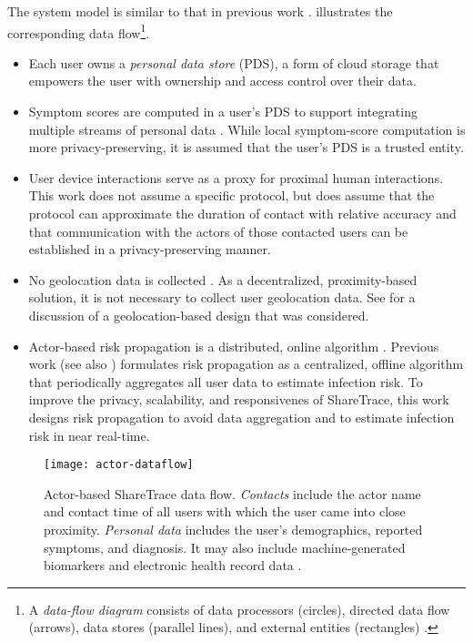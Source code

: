 The system model is similar to that in previous work \cite{Ayday2020,Ayday2021}.  illustrates the corresponding data flow\footnote{A \emph{data-flow diagram} consists of data processors (circles), directed data flow (arrows), data stores (parallel lines), and external entities (rectangles) \cite[pp. 437--438]{Fowler2004}\label{foot:dataflow}.}.
%
\begin{itemize}
    \item Each user owns a \emph{personal data store} (PDS), a form of cloud storage that empowers the user with ownership and access control over their data.
    \item Symptom scores are computed in a user's PDS to support integrating multiple streams of personal data \cite{Ayday2020}. While local symptom-score computation \cite{Ayday2020, Ayday2021} is more privacy-preserving, it is assumed that the user's PDS is a trusted entity.
    \item User device interactions serve as a proxy for proximal human interactions. This work does not assume a specific protocol, but does assume that the protocol can approximate the duration of contact with relative accuracy and that communication with the actors of those contacted users can be
    established in a privacy-preserving manner.
    \item No geolocation data is collected \cite{Ayday2020}. As a decentralized, proximity-based solution, it is not necessary to collect user geolocation data. See  for a discussion of a geolocation-based design that was considered.
    \item Actor-based risk propagation is a distributed, online algorithm \cite[pp. 791--818]{Cormen2022}. Previous work \cite{Ayday2020, Ayday2021} (see also ) formulates risk propagation as a centralized, offline algorithm that periodically aggregates all user data to estimate infection risk. To improve the privacy, scalability, and responsivenes of ShareTrace, this work designs risk propagation to avoid data aggregation and to estimate infection risk in near real-time.
\end{itemize}
%
\begin{figure}[htb]
    \texttt{[image: actor-dataflow]}
    \caption[Actor-based ShareTrace data flow]{Actor-based ShareTrace data flow. \emph{Contacts} include the actor name and contact time of all users with which the user came into close proximity. \emph{Personal data} includes the user's demographics, reported symptoms, and diagnosis. It may also include machine-generated biomarkers and electronic health record data
    \cite{Ayday2020}.}
    \label{fig:actor-dataflow}
\end{figure}

